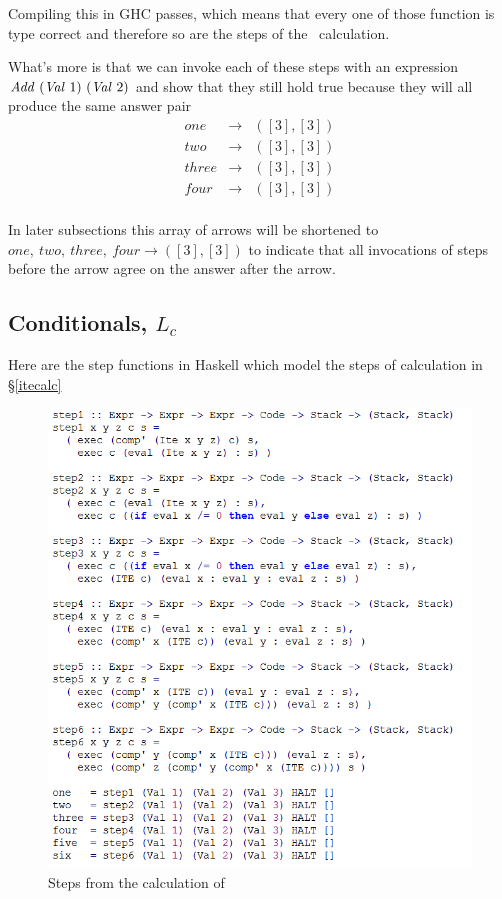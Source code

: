 \documentclass {article}
\begin{document}
Compiling this in GHC passes, which means that
every one of those function is type correct and
therefore so are the steps of the \add\ calculation.

What's more is that we can invoke each of these steps
with an expression 
\( \mathit{Add\ } (\mathit{Val\ } 1)\ (\mathit{Val\ } 2) \)
 and show that they still hold true
because they will all produce the same answer pair
\begin{eqnarray*}
\mathit{one} &\rightarrow& ([3], [3]) \\
\mathit{two} &\rightarrow& ([3], [3]) \\
\mathit{three} &\rightarrow& ([3], [3]) \\
\mathit{four} &\rightarrow& ([3], [3]) \\
\end{eqnarray*}

In later subsections
this array of arrows will be shortened to
\( \mathit{one,\ two,\ three,\ four } \rightarrow ([3], [3]) \)
to indicate that all invocations of steps before 
the arrow agree on the answer after the arrow.

\subsection{Conditionals, $L_c$}

Here are the step functions in Haskell which model the
steps of calculation in \S\ref{itecalc}
\begin{figure}[h] 
\includegraphics[scale=0.8]{Itesteps}
\caption{Steps from the calculation of \ite}
\label{figite}
\end{figure}
\end{document}
